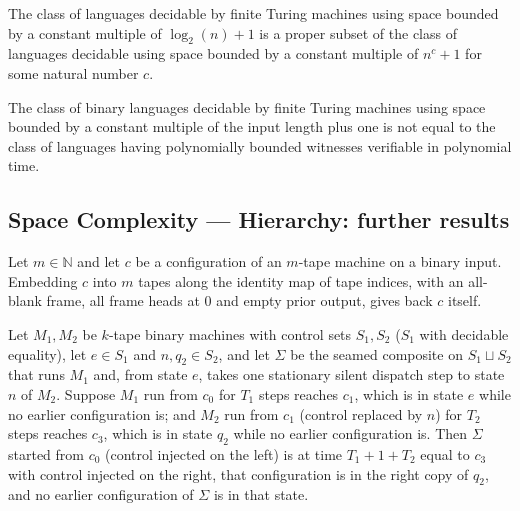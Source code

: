 \begin{theorem}
\label{Complexity.LOGSPACE_ssubset_PSPACE}
\leanok
{}
The class of languages decidable by finite Turing machines using space bounded by a
constant multiple of $\log_2(n)+1$ is a proper subset of the class of languages
decidable using space bounded by a constant multiple of $n^c+1$ for some natural number
$c$.
\end{theorem}

\begin{theorem}
\label{Complexity.SPACE_linear_ne_NP}
\leanok
{}
The class of binary languages decidable by finite Turing machines using space bounded by
a constant multiple of the input length plus one is not equal to the class of languages
having polynomially bounded witnesses verifiable in polynomial time.
\end{theorem}

\subsection*{Space Complexity --- Hierarchy: further results}

\begin{theorem}
\label{Complexity.f6_full_embed}
\leanok
{}
Let $m\in\mathbb{N}$ and let $c$ be a configuration of an $m$-tape machine on a binary input.
Embedding $c$ into $m$ tapes along the identity map of tape indices, with an all-blank frame,
all frame heads at $0$ and empty prior output, gives back $c$ itself.
\end{theorem}

\begin{theorem}
\label{Complexity.f6_seam}
\leanok
{}
Let $M_1,M_2$ be $k$-tape binary machines with control sets $S_1,S_2$ ($S_1$ with decidable
equality), let $e\in S_1$ and $n,q_2\in S_2$, and let $\Sigma$ be the seamed composite on
$S_1\sqcup S_2$ that runs $M_1$ and, from state $e$, takes one stationary silent dispatch step to
state $n$ of $M_2$. Suppose $M_1$ run from $c_0$ for $T_1$ steps reaches $c_1$, which is in state
$e$ while no earlier configuration is; and $M_2$ run from $c_1$ (control replaced by $n$) for
$T_2$ steps reaches $c_3$, which is in state $q_2$ while no earlier configuration is. Then $\Sigma$
started from $c_0$ (control injected on the left) is at time $T_1+1+T_2$ equal to $c_3$ with control
injected on the right, that configuration is in the right copy of $q_2$, and no earlier
configuration of $\Sigma$ is in that state.
\end{theorem}

